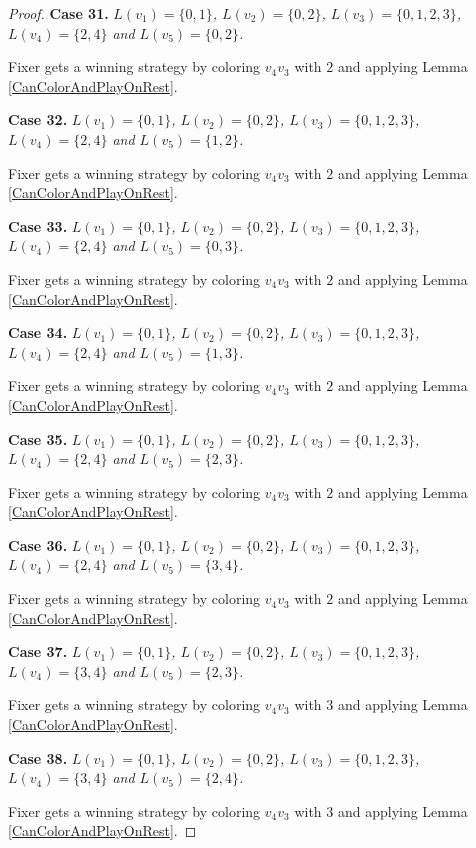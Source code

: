 \documentclass[12pt]{amsart}
\theoremstyle{plain}
\theoremstyle{definition}
\theoremstyle{remark}
\begin{document}
\begin{proof}
\noindent\textbf{Case 31.  }\textit{$L(v_1) = \{0, 1\}$, $L(v_2) = \{0, 2\}$, $L(v_3) = \{0, 1, 2, 3\}$, $L(v_4) = \{2, 4\}$ and $L(v_5) = \{0, 2\}$.}

Fixer gets a winning strategy by coloring $v_4v_3$ with $2$ and applying Lemma \ref{CanColorAndPlayOnRest}.

\noindent\textbf{Case 32.  }\textit{$L(v_1) = \{0, 1\}$, $L(v_2) = \{0, 2\}$, $L(v_3) = \{0, 1, 2, 3\}$, $L(v_4) = \{2, 4\}$ and $L(v_5) = \{1, 2\}$.}

Fixer gets a winning strategy by coloring $v_4v_3$ with $2$ and applying Lemma \ref{CanColorAndPlayOnRest}.

\noindent\textbf{Case 33.  }\textit{$L(v_1) = \{0, 1\}$, $L(v_2) = \{0, 2\}$, $L(v_3) = \{0, 1, 2, 3\}$, $L(v_4) = \{2, 4\}$ and $L(v_5) = \{0, 3\}$.}

Fixer gets a winning strategy by coloring $v_4v_3$ with $2$ and applying Lemma \ref{CanColorAndPlayOnRest}.

\noindent\textbf{Case 34.  }\textit{$L(v_1) = \{0, 1\}$, $L(v_2) = \{0, 2\}$, $L(v_3) = \{0, 1, 2, 3\}$, $L(v_4) = \{2, 4\}$ and $L(v_5) = \{1, 3\}$.}

Fixer gets a winning strategy by coloring $v_4v_3$ with $2$ and applying Lemma \ref{CanColorAndPlayOnRest}.

\noindent\textbf{Case 35.  }\textit{$L(v_1) = \{0, 1\}$, $L(v_2) = \{0, 2\}$, $L(v_3) = \{0, 1, 2, 3\}$, $L(v_4) = \{2, 4\}$ and $L(v_5) = \{2, 3\}$.}

Fixer gets a winning strategy by coloring $v_4v_3$ with $2$ and applying Lemma \ref{CanColorAndPlayOnRest}.

\noindent\textbf{Case 36.  }\textit{$L(v_1) = \{0, 1\}$, $L(v_2) = \{0, 2\}$, $L(v_3) = \{0, 1, 2, 3\}$, $L(v_4) = \{2, 4\}$ and $L(v_5) = \{3, 4\}$.}

Fixer gets a winning strategy by coloring $v_4v_3$ with $2$ and applying Lemma \ref{CanColorAndPlayOnRest}.

\noindent\textbf{Case 37.  }\textit{$L(v_1) = \{0, 1\}$, $L(v_2) = \{0, 2\}$, $L(v_3) = \{0, 1, 2, 3\}$, $L(v_4) = \{3, 4\}$ and $L(v_5) = \{2, 3\}$.}

Fixer gets a winning strategy by coloring $v_4v_3$ with $3$ and applying Lemma \ref{CanColorAndPlayOnRest}.

\noindent\textbf{Case 38.  }\textit{$L(v_1) = \{0, 1\}$, $L(v_2) = \{0, 2\}$, $L(v_3) = \{0, 1, 2, 3\}$, $L(v_4) = \{3, 4\}$ and $L(v_5) = \{2, 4\}$.}

Fixer gets a winning strategy by coloring $v_4v_3$ with $3$ and applying Lemma \ref{CanColorAndPlayOnRest}.


\end{proof}
\end{document}
